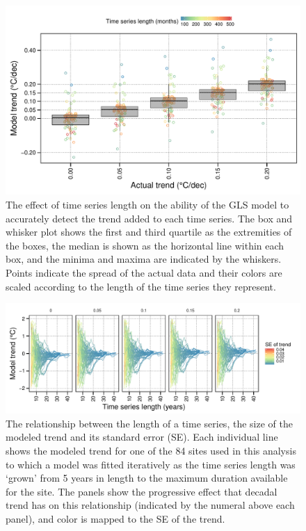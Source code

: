 \documentclass[]{ametsoc}
\begin{document}
\begin{figure}
\centering \includegraphics[width=1.0\textwidth]{figure03}
\caption{The effect of time series length on the ability of the GLS model to accurately detect the trend added to each time series. The box and whisker plot shows the first and third quartile as the extremities of the boxes, the median is shown as the horizontal line within each box, and the minima and maxima are indicated by the whiskers. Points indicate the spread of the actual data and their colors are scaled according to the length of the time series they represent.}
\label{figure03}
\end{figure}

\begin{figure}
\centering \includegraphics[width=1.0\textwidth]{figure04}
\caption{The relationship between the length of a time series, the size of the modeled trend and its standard error (SE). Each individual line shows the modeled trend for one of the 84 sites used in this analysis to which a model was fitted iteratively as the time series length was `grown' from 5 years in length to the maximum duration available for the site. The panels show the progressive effect that decadal trend has on this relationship (indicated by the numeral above each panel), and color is mapped to the SE of the trend.}
\label{figure04}
\end{figure}
\end{document}
